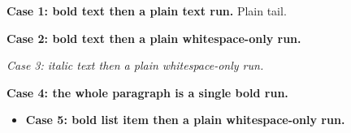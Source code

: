 \documentclass[11pt,a4paper]{article}
\begin{document}
\textbf{Case 1: bold text then a plain text run.} Plain tail.

\textbf{Case 2: bold text then a plain whitespace-only run.}

\textit{Case 3: italic text then a plain whitespace-only run.}

\textbf{Case 4: the whole paragraph is a single bold run.}

\begin{itemize}
\item \textbf{Case 5: bold list item then a plain whitespace-only run.}
\end{itemize}
\end{document}
